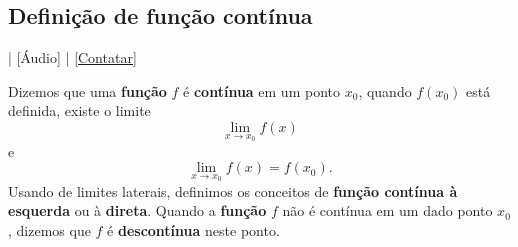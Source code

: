 \subsection{Definição de função contínua}

\begin{flushright}
  [Vídeo] | [Áudio] | \href{https://phkonzen.github.io/notas/contato.html}{[Contatar]}
\end{flushright}

Dizemos que uma {\bf função} $f$ é {\bf contínua} em um ponto $x_0$, quando $f(x_0)$ está definida, existe o limite
\begin{equation}
  \lim_{x\to x_0} f(x)
\end{equation}
e
\begin{equation}
  \lim_{x\to x_0} f(x) = f(x_0).
\end{equation}
Usando de limites laterais, definimos os conceitos de {\bf função contínua à esquerda} ou à {\bf direta}. Quando a {\bf função} $f$ não é contínua em um dado ponto $x_0$, dizemos que $f$ é {\bf descontínua} neste ponto.

